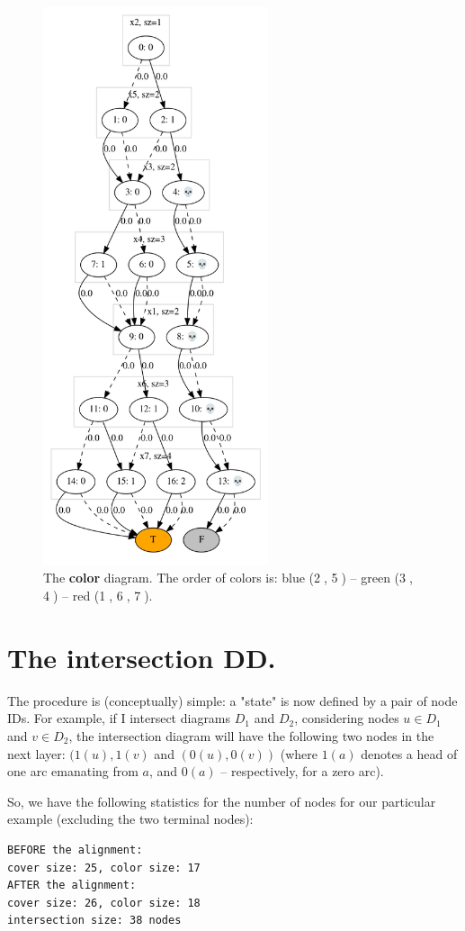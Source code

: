 \documentclass[11pt]{article}
\begin{document}
\begin{figure}[htbp]
\centering
\includegraphics[width=250px]{./color.png}
\caption{\label{fig:color}The \textbf{color} diagram. The order of colors is: blue (\textcircled{2}, \textcircled{5}) -- green (\textcircled{3}, \textcircled{4}) -- red (\textcircled{1}, \textcircled{6}, \textcircled{7}).}
\end{figure}

\section{The intersection DD.}
\label{sec:orgb78f4bd}
The procedure is (conceptually) simple: a "state" is now defined by a pair of
node IDs. For example, if I intersect diagrams \(D_1\) and \(D_2\), considering
nodes \(u\in D_1\) and \(v\in D_2\), the intersection diagram will have the
following two nodes in the next layer: \((1(u), 1(v)\) and \((0(u), 0(v))\) (where
\(1(a)\) denotes a head of one arc emanating from \(a\), and \(0(a)\) --
respectively, for a zero arc).

So, we have the following statistics for the number of nodes for our
particular example (excluding the two terminal nodes):
\begin{verbatim}
BEFORE the alignment:
cover size: 25, color size: 17
AFTER the alignment:
cover size: 26, color size: 18
intersection size: 38 nodes
\end{verbatim}
\end{document}
